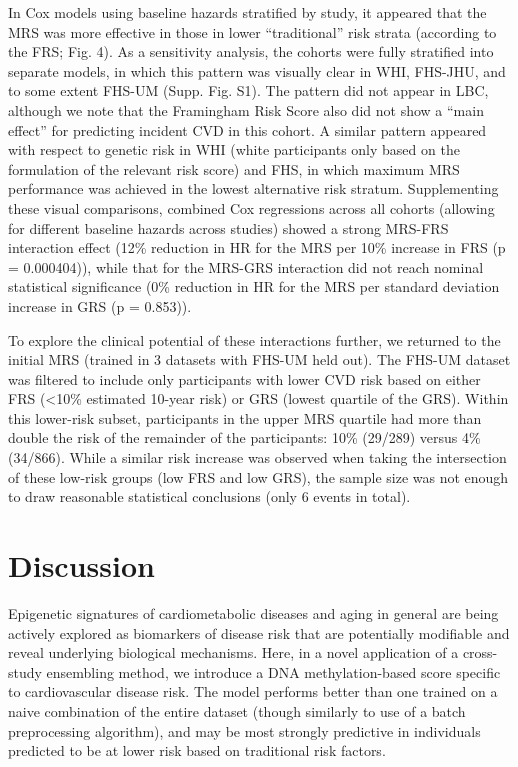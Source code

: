 \documentclass[]{article}
\begin{document}
In Cox models using baseline hazards stratified by study, it appeared
that the MRS was more effective in those in lower ``traditional'' risk
strata (according to the FRS; Fig. 4). As a sensitivity analysis, the
cohorts were fully stratified into separate models, in which this
pattern was visually clear in WHI, FHS-JHU, and to some extent FHS-UM
(Supp. Fig. S1). The pattern did not appear in LBC, although we note
that the Framingham Risk Score also did not show a ``main effect'' for
predicting incident CVD in this cohort. A similar pattern appeared with
respect to genetic risk in WHI (white participants only based on the
formulation of the relevant risk score) and FHS, in which maximum MRS
performance was achieved in the lowest alternative risk stratum.
Supplementing these visual comparisons, combined Cox regressions across
all cohorts (allowing for different baseline hazards across studies)
showed a strong MRS-FRS interaction effect (12\% reduction in HR for the
MRS per 10\% increase in FRS (p = 0.000404)), while that for the MRS-GRS
interaction did not reach nominal statistical significance (0\%
reduction in HR for the MRS per standard deviation increase in GRS (p =
0.853)).

To explore the clinical potential of these interactions further, we
returned to the initial MRS (trained in 3 datasets with FHS-UM held
out). The FHS-UM dataset was filtered to include only participants with
lower CVD risk based on either FRS (\textless{}10\% estimated 10-year
risk) or GRS (lowest quartile of the GRS). Within this lower-risk
subset, participants in the upper MRS quartile had more than double the
risk of the remainder of the participants: 10\% (29/289) versus 4\%
(34/866). While a similar risk increase was observed when taking the
intersection of these low-risk groups (low FRS and low GRS), the sample
size was not enough to draw reasonable statistical conclusions (only 6
events in total).

\hypertarget{discussion}{%
\section{Discussion}\label{discussion}}

Epigenetic signatures of cardiometabolic diseases and aging in general
are being actively explored as biomarkers of disease risk that are
potentially modifiable and reveal underlying biological mechanisms.
Here, in a novel application of a cross-study ensembling method, we
introduce a DNA methylation-based score specific to cardiovascular
disease risk. The model performs better than one trained on a naive
combination of the entire dataset (though similarly to use of a batch
preprocessing algorithm), and may be most strongly predictive in
individuals predicted to be at lower risk based on traditional risk
factors.
\end{document}
